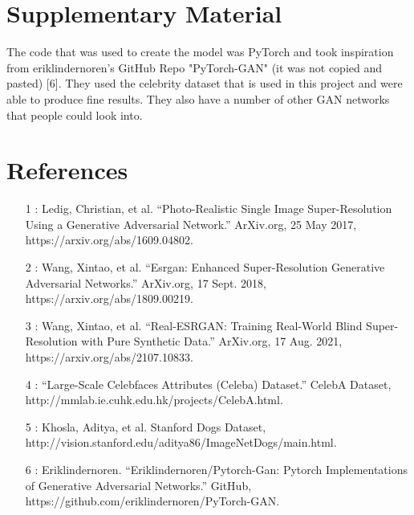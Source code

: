 \documentclass{article}
\begin{document}
\section{Supplementary Material}

The code that was used to create the model was PyTorch and took inspiration from eriklindernoren's GitHub Repo "PyTorch-GAN" (it was not copied and pasted) [6]. They used the celebrity dataset that is used in this project and were able to produce fine results. They also have a number of other GAN networks that people could look into.

\section*{References}

\begin{enumerate}
  \item [1]: Ledig, Christian, et al. “Photo-Realistic Single Image Super-Resolution Using a Generative Adversarial Network.” ArXiv.org, 25 May 2017, https://arxiv.org/abs/1609.04802. 
  \item [2]: Wang, Xintao, et al. “Esrgan: Enhanced Super-Resolution Generative Adversarial Networks.” ArXiv.org, 17 Sept. 2018, https://arxiv.org/abs/1809.00219. 
  \item [3]: Wang, Xintao, et al. “Real-ESRGAN: Training Real-World Blind Super-Resolution with Pure Synthetic Data.” ArXiv.org, 17 Aug. 2021, https://arxiv.org/abs/2107.10833. 
  \item [4]: “Large-Scale Celebfaces Attributes (Celeba) Dataset.” CelebA Dataset, http://mmlab.ie.cuhk.edu.hk/projects/CelebA.html. 
  \item [5]: Khosla, Aditya, et al. Stanford Dogs Dataset, http://vision.stanford.edu/aditya86/ImageNetDogs/main.html. 
  \item [6]: Eriklindernoren. “Eriklindernoren/Pytorch-Gan: Pytorch Implementations of Generative Adversarial Networks.” GitHub, https://github.com/eriklindernoren/PyTorch-GAN. 
\end{enumerate}
\end{document}
